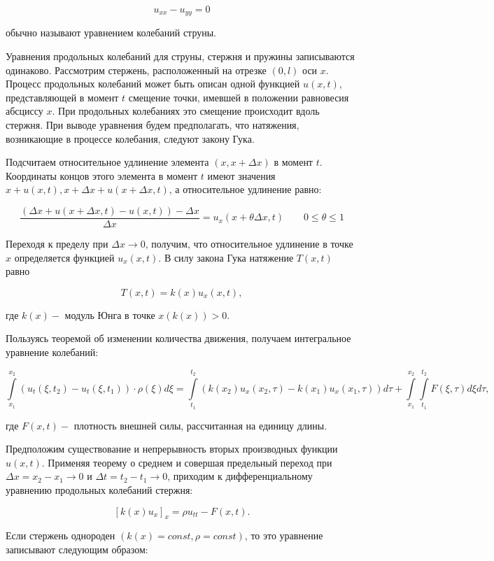 $$u_{xx} - u_{yy} = 0$$

\noindent обычно называют уравнением колебаний струны.

Уравнения продольных колебаний для струны, стержня и пружины записываются одинаково. Рассмотрим стержень, расположенный на отрезке $(0, l)$ оси $x$. Процесс продольных колебаний может быть описан одной функцией $u(x, t)$, представляющей в момент $t$ смещение точки, имевшей в положении равновесия абсциссу $x$. При продольных колебаниях это смещение происходит вдоль стержня. При выводе уравнения будем предполагать, что натяжения, возникающие в процессе колебания, следуют закону Гука.

Подсчитаем относительное удлинение элемента $(x, x + \Delta x)$ в момент $t$. Координаты концов этого элемента в момент $t$ имеют значения $x + u(x, t), x + \Delta x + u(x + \Delta x, t)$, а относительное удлинение равно:

$$\frac{\left( \Delta x + u(x + \Delta x, t) - u(x, t)\right) - \Delta x}{\Delta x} = u_{x}(x + \theta \Delta x, t) \quad\quad 0 \le \theta \le 1$$ 

Переходя к пределу при $\Delta x \rightarrow 0$, получим, что относительное удлинение в точке $x$ определяется функцией $u_{x}(x, t)$. В силу закона Гука натяжение $T(x, t)$ равно

$$T(x, t) = k(x)u_{x}(x, t),$$

\noindent где $k(x) - $ модуль Юнга в точке $x(k(x)) > 0$.

Пользуясь теоремой об изменении количества движения, получаем интегральное уравнение колебаний:

$$\int\limits_{x_{1}}^{x_{2}}\left( u_{t}(\xi, t_{2}) - u_{t}(\xi, t_{1})\right) \cdot \rho(\xi)d\xi = \int\limits_{t_{1}}^{t_{2}}\left( k(x_{2})u_{x}(x_{2}, \tau) - k(x_{1})u_{x}(x_{1}, \tau)\right)d\tau + \int\limits_{x_{1}}^{x_{2}} \int\limits_{t_{1}}^{t_{2}}F(\xi, \tau)d\xi d\tau,$$

\noindent где $F(x, t) -$ плотность внешней силы, рассчитанная на единицу длины.

Предположим существование и непрерывность вторых производных функции $u(x, t)$. Применяя теорему о среднем и совершая предельный переход при $\Delta x = x_{2} - x_{1} \rightarrow 0$ и $\Delta t = t_{2} - t_{1} \rightarrow 0$, приходим к дифференциальному уравнению продольных колебаний стержня:

$$[k(x)u_{x}]_{x} = \rho u_{tt} - F(x, t).$$

Если стержень однороден $(k(x) = const, \rho = const)$, то это уравнение записывают следующим образом:

